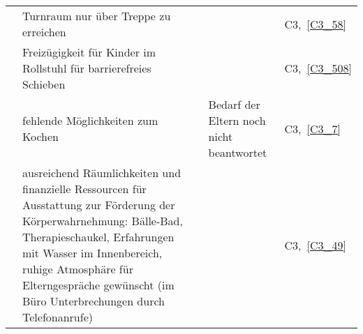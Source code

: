 \begin{landscape}
\begin{small}
\begin{centering}
\begin{longtable}{p{2cm}p{8.5cm}p{4cm}p{4cm}p{1.5cm}}
\cmidrule{2 - 5}
& Turnraum nur über Treppe zu erreichen & & & C3,~\ref{C3_58}\\
\cmidrule{2 - 5}
& Freizügigkeit für Kinder im Rollstuhl für barrierefreies Schieben & & & C3,~\ref{C3_508}\\
\cmidrule{2 - 5}
& fehlende Möglichkeiten zum Kochen & & Bedarf der Eltern noch nicht beantwortet & C3,~\ref{C3_7}\\
\cmidrule{2 - 5} 
& ausreichend Räumlichkeiten und finanzielle Ressourcen für Ausstattung zur Förderung der Körperwahrnehmung: Bälle-Bad, Therapieschaukel, Erfahrungen mit Wasser im Innenbereich, ruhige Atmosphäre für Elterngespräche gewünscht (im Büro Unterbrechungen durch Telefonanrufe)\vspace{1.5em}& & & C3,~\ref{C3_49}\\


\end{longtable}
\end{centering}
\end{small}
\end{landscape}
